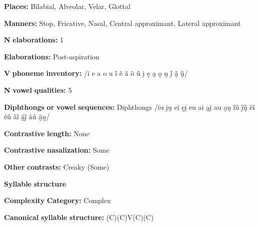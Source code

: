 \begin{styleBody}
\textbf{Places:} Bilabial, Alveolar, Velar, Glottal
\end{styleBody}

\begin{styleBody}
\textbf{Manners:} Stop, Fricative, Nasal, Central approximant, Lateral approximant
\end{styleBody}

\begin{styleBody}
\textbf{N} \textbf{elaborations:} 1
\end{styleBody}

\begin{styleBody}
\textbf{Elaborations:} Post-aspiration
\end{styleBody}

\begin{styleBody}
\textbf{V} \textbf{phoneme} \textbf{inventory:} /i e a o u ĩ ẽ ã õ ũ ḭ ḛ a̰ o̰ ṵ ḭ̃ ã̰ ṵ̃/
\end{styleBody}

\begin{styleBody}
\textbf{N} \textbf{vowel} \textbf{qualities:} 5
\end{styleBody}

\begin{styleBody}
\textbf{Diphthongs} \textbf{or} \textbf{vowel} \textbf{sequences:} Diphthongs /iu ḭṵ ei ḛḭ eu ai a̰ḭ au a̰ṵ ĩũ ḭ̃ṵ̃ ẽĩ ẽũ ãĩ ã̰ḭ̃ ãũ ã̰ṵ/
\end{styleBody}

\begin{styleBody}
\textbf{Contrastive} \textbf{length:} None
\end{styleBody}

\begin{styleBody}
\textbf{Contrastive} \textbf{nasalization:} Some
\end{styleBody}

\begin{styleBody}
\textbf{Other} \textbf{contrasts:} Creaky (Some)
\end{styleBody}

\begin{styleBody}
\textbf{Syllable} \textbf{structure}
\end{styleBody}

\begin{styleBody}
\textbf{Complexity} \textbf{Category:} Complex
\end{styleBody}

\begin{styleBody}
\textbf{Canonical} \textbf{syllable} \textbf{structure:} (C)(C)V(C)(C) \citep[124-34]{Eberhard2009}
\end{styleBody}


